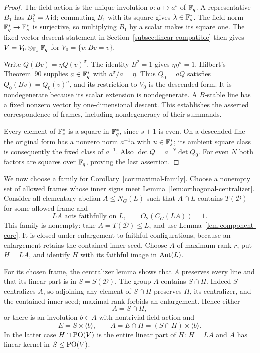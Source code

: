 \begin{proof}
The field action is the unique involution $\sigma:a\mapsto a^s$ of
$\mathbb F_q$.  A representative $B_1$ has $B_1^2=\lambda\operatorname{id}$; commuting
$B_1$ with its square gives $\lambda\in\mathbb F_s^*$.  The field norm
$\mathbb F_q^*\to\mathbb F_s^*$ is surjective, so multiplying $B_1$ by a scalar
makes its square one.  The fixed-vector descent statement in
Section~\ref{subsec:linear-compatible} then gives
$V=V_0\otimes_{\mathbb F_s}\mathbb F_q$ for $V_0=\{v:Bv=v\}$.

Write $Q(Bv)=\eta Q(v)^\sigma$.  The identity $B^2=1$ gives
$\eta\eta^\sigma=1$.  Hilbert's Theorem~90
\citep[Corollary~5.25]{MilneFields2022} supplies $a\in\mathbb F_q^*$
with $a^\sigma/a=\eta$.  Thus $Q_0=aQ$ satisfies
$Q_0(Bv)=Q_0(v)^\sigma$, and its restriction to $V_0$ is the descended
form.  It is nondegenerate because its scalar extension is
nondegenerate.  A $B$-stable line has a fixed nonzero vector by
one-dimensional descent.  This establishes the asserted correspondence
of frames, including nondegeneracy of their summands.

Every element of $\mathbb F_s^*$ is a square in $\mathbb F_q^*$, since $s+1$ is
even.  On a descended line the original form has a nonzero norm
$a^{-1}u$ with $u\in\mathbb F_s^*$; its ambient square class is consequently
the fixed class of $a^{-1}$.  Also
$\det Q=a^{-N}\det Q_0$.  For even $N$ both factors are squares over
$\mathbb F_q$, proving the last assertion.
\end{proof}

We now choose a family for Corollary~\ref{cor:maximal-family}.
Choose a nonempty set of allowed frames
whose inner signs meet Lemma~\ref{lem:orthogonal-centralizer}.  Consider
all elementary abelian $A\le N_G(L)$ such that $A\cap L$ contains
$T(\mathcal D)$ for some allowed frame and
\begin{equation}\label{eq:orthogonal-config}
 LA\text{ acts faithfully on }L,
 \qquad O_2(C_G(LA))=1.
\end{equation}
This family is nonempty: take $A=T(\mathcal D)\le L$, and use
Lemma~\ref{lem:component-core}. It is closed under enlargement to
faithful configurations, because an enlargement retains the contained
inner seed. Choose $A$ of maximum rank $r$, put
$H=LA$, and identify $H$ with its faithful image in $\operatorname{Aut}(L)$.

For its chosen frame, the centralizer lemma shows that $A$ preserves
every line and that its linear part is in $S=S(\mathcal D)$.  The group
$A$ contains $S\cap H$.  Indeed $S$ centralizes $A$, so adjoining any
element of $S\cap H$ preserves $H$, its centralizer, and the contained
inner seed; maximal rank forbids an enlargement.  Hence either
\begin{equation}\label{eq:orthogonal-A-no-field}
 A=S\cap H,
\end{equation}
or there is an involution $b\in A$ with nontrivial field action and
\begin{equation}\label{eq:orthogonal-A-field}
 E=S\times\langle b\rangle,\qquad
 A=E\cap H=(S\cap H)\times\langle b\rangle.
\end{equation}
In the latter case $H\cap\operatorname{PO}(V)$ is the entire linear part of $H$:
$H=L A$ and $A$ has linear kernel in $S\le\operatorname{PO}(V)$.

